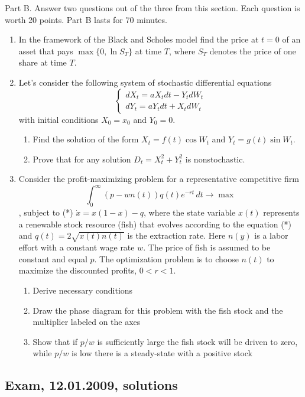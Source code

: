 \documentclass[12pt, a4paper]{article}
\begin{document}
Part B.
Answer two questions out of the three from this section. Each question is worth 20 points.
Part B lasts for 70 minutes.
\begin{enumerate}[resume]
\item  In the framework of the Black and Scholes model find the price at $t=0$ of an asset that pays $\max\{0,\ln S_T\}$  at time $T$, where $S_T$ denotes the price of one share at time $T$.

\item Let's consider the following system of stochastic differential equations
\[
\begin{cases}
    dX_t=aX_t dt-Y_t dW_t \\
    dY_t=aY_t dt+X_t dW_t
\end{cases}
\]
with initial conditions $X_0=x_0$ and $Y_0=0$.
\begin{enumerate}
\item Find the solution of the form $X_t=f(t)\cos W_t$ and $Y_t=g(t)\sin W_t$.
\item Prove that for any solution $D_t=X_t^2+Y_t^2$ is nonstochastic.
\end{enumerate}


\item Consider the profit-maximizing problem for a representative competitive firm
\[
\int_0^{\infty} (p-wn(t))q(t)e^{-rt}\, dt \to \max
\]
, subject to (*) $\dot{x}=x(1-x)-q$, where the state variable $x(t)$ represents a renewable stock resource (fish) that evolves according to the equation (*) and $q(t)=2\sqrt{x(t)n(t)}$ is the extraction rate. Here $n(y)$ is a labor effort with a constant wage rate $w$. The price of fish is assumed to be constant and equal $p$.  The optimization problem is to choose $n(t)$ to maximize the discounted profits, $0<r<1$.
\begin{enumerate}
\item Derive necessary conditions
\item Draw the phase diagram for this problem with the fish stock and the multiplier labeled on the axes
\item Show that if $p/w$ is sufficiently large the fish stock will be driven to zero, while $p/w$ is low there is a steady-state with a positive stock
\end{enumerate}
\end{enumerate}

\subsection{Exam, 12.01.2009, solutions}
\end{document}
